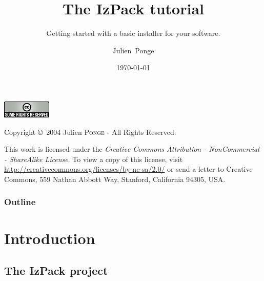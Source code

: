 \documentclass[compress,10pt]{beamer}
\title{The IzPack tutorial}
\subtitle{Getting started with a basic installer for your software.}
\author{Julien~Ponge\inst{1}}
\institute
{
  \inst{1}%
  \texttt{<julien@izforge.com>}\\
  \url{http://www.izforge.com/}\\
  IzPack project founder and current maintainer.
}
\date{\today}
\begin{document}

\begin{frame}
  \titlepage
\end{frame}


\begin{frame}[plain]

\footnotesize

\href{http://www.creativecommons.org/}{\includegraphics[scale=0.5]{cc}}

\vspace{2em}

Copyright \copyright~2004 Julien \textsc{Ponge} - All Rights Reserved.

\vspace{2em}
\sloppy
This work is licensed under the \textit{Creative Commons
Attribution - NonCommercial - ShareAlike License}. To view a copy of this license,
visit
\href{http://creativecommons.org/licenses/by-nc-sa/2.0/}{\url{http://creativecommons.org/licenses/by-nc-sa/2.0/}}
or send a letter to Creative Commons, 559 Nathan Abbott Way, Stanford,
California 94305, USA.

\end{frame}


\begin{frame}
  \frametitle{Outline}
  \tableofcontents
\end{frame}


\section{Introduction}


\subsection{The IzPack project}

\end{document}
